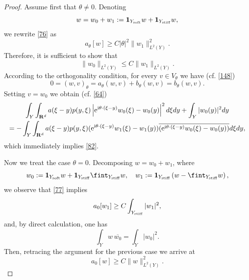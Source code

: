 \documentclass[11pt]{article}
\newcommand\stiff{{\rm stiff}}
\newcommand\soft{{\rm soft}}
\def\rme{{\rm e}}
\def\rmi{{\rm i}}
\newcommand{\R}{\mathbf{R}}
\theoremstyle{remark}
\begin{document}
\begin{proof}
	
Assume first that $\theta \neq 0$. Denoting
\begin{equation*}
	w = w_0 +w_1 : =  \mathbf{1}_{Y_\soft} w + \mathbf{1}_{Y_\stiff} w,
\end{equation*}
we rewrite \eqref{76} as
\begin{equation*}
	a_\theta[w] \geq   C |\theta|^2  \|w_1 \|_{L^2(Y)}^2.
\end{equation*}
Therefore, it is sufficient to show that
\begin{equation}\label{82}
	\| w_0\|_{L^2(Y)} \leq C\|w_1 \|_{L^2(Y)}.
\end{equation}
According to the orthogonality condition, for every $v\in V_\theta$ we have (cf. \eqref{148})
\begin{equation}\label{166}
	0=	(w,v)_\theta = a_\theta(w,v) + b_\theta(w,v) = b_\theta(w,v).
\end{equation}
Setting $v = w_0$ we obtain (cf. \eqref{64})
\begin{multline*}%
	\int_{Y}\int_{\R^d} a(\xi - y) p(y,\xi) \left|\rme^{\rmi \theta\cdot(\xi - y)} w_0(\xi)-w_0(y)\right|^2 d\xi dy
	+  \int_{Y} |w_0(y)|^2 dy
	\\
	= - \int_{Y}\int_{\R^d} a(\xi - y) p(y,\xi) (\rme^{\rmi \theta\cdot(\xi - y)} w_1(\xi)-w_1(y))\overline{(\rme^{\rmi \theta\cdot(\xi - y)} w_0(\xi)-w_0(y))}d\xi dy,
\end{multline*}
which immediately implies  \eqref{82}.

Now we treat the case $\theta = 0$. Decomposing $w = w_0 +w_1$, where
\begin{equation*}
	w_0	 : =  \mathbf{1}_{Y_\soft} w + \mathbf{1}_{Y_\stiff} \fint_{Y_\stiff} w , \quad w_1	 : =  \mathbf{1}_{Y_\stiff}\left( w -  \fint_{Y_\stiff} w\right),
\end{equation*}
we observe that \eqref{77} implies
\begin{equation*}
	a_0[w_1] \geq  C   \int_{Y_\stiff}|w_1|^2,
\end{equation*}
and, by direct calculation, one has
\begin{equation*}
	\int_{Y} w \, \overline{w_0} = 	\int_{Y} |w_0|^2.
\end{equation*}
Then, retracing the argument for the previous  case  we arrive at
\begin{equation*}
	a_0[w] \geq  C  \|w \|_{L^2(Y)}^2.
\end{equation*}
\end{proof}
\end{document}
